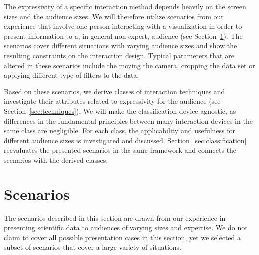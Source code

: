 \documentclass[review,journal]{vgtc}         %
\begin{document}
The expressivity of a specific interaction method depends heavily on the screen sizes and the audience sizes.
We will therefore utilize scenarios from our experience that involve one person interacting with a visualization in order to present information to a, in general non-expert, audience (see Section~\ref{sec:scenario}).
The scenarios cover different situations with varying audience sizes and show the resulting constraints on the interaction design.
Typical parameters that are altered in these scenarios include the moving the camera, cropping the data set or applying different type of filters to the data.

Based on these scenarios, we derive classes of interaction techniques and investigate their attributes related to expressivity for the audience (see Section~\ref{sec:techniques}).
We will make the classification device-agnostic, as differences in the fundamental principles between many interaction devices in the same class are negligible.
For each class, the applicability and usefulness for different audience sizes is investigated and discussed.
Section~\ref{sec:classification} reevaluates the presented scenarios in the same framework and connects the scenarios with the derived classes.

%
%
%
\section{Scenarios} \label{sec:scenario}
The scenarios described in this section are drawn from our experience in presenting scientific data to audiences of varying sizes and expertise.
We do not claim to cover all possible presentation cases in this section, yet we selected a subset of scenarios that cover a large variety of situations.

%
%
\end{document}
